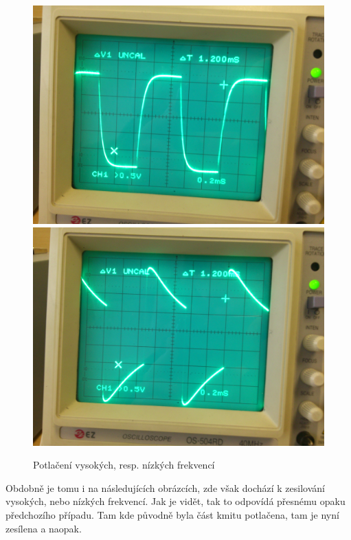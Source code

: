 \documentclass[12pt]{article} %
\begin{document}
\begin{figure}[H]
\includegraphics[scale=0.065]{IMG_20131119_133630.jpg}
\includegraphics[scale=0.065]{IMG_20131119_133652.jpg}
\caption{Potlačení vysokých, resp. nízkých frekvencí}
\end{figure}

Obdobně je tomu i na následujících obrázcích, zde však dochází k zesilování vysokých, nebo nízkých frekvencí. Jak je vidět, tak to odpovídá přesnému opaku předchozího případu. Tam kde původně byla část kmitu potlačena, tam je nyní zesílena a naopak.
\end{document}
